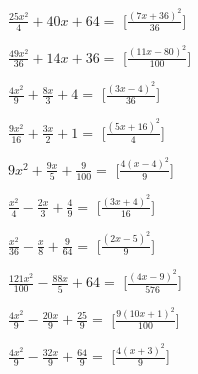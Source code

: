 \begin{esercizio}
\begin{multicols}{2}
\begin{enumeratea}
\item \(\frac{25 x^{2}}{4} + 40 x + 64=\) 
\hfill [\(\frac{\left(7 x + 36\right)^{2}}{36}\)]
\item \(\frac{49 x^{2}}{36} + 14 x + 36=\) 
\hfill [\(\frac{\left(11 x - 80\right)^{2}}{100}\)]
\item \(\frac{4 x^{2}}{9} + \frac{8 x}{3} + 4=\) 
\hfill [\(\frac{\left(3 x - 4\right)^{2}}{36}\)]
\item \(\frac{9 x^{2}}{16} + \frac{3 x}{2} + 1=\) 
[\(\frac{\left(5 x + 16\right)^{2}}{4}\)]
\item \(9 x^{2} + \frac{9 x}{5} + \frac{9}{100}=\) 
\hfill [\(\frac{4 \left(x - 4\right)^{2}}{9}\)]
\item \(\frac{x^{2}}{4} - \frac{2 x}{3} + \frac{4}{9}=\) 
\hfill [\(\frac{\left(3 x + 4\right)^{2}}{16}\)]
\item \(\frac{x^{2}}{36} - \frac{x}{8} + \frac{9}{64}=\) 
\hfill [\(\frac{\left(2 x - 5\right)^{2}}{9}\)]
\item \(\frac{121 x^{2}}{100} - \frac{88 x}{5} + 64=\) 
\hfill [\(\frac{\left(4 x - 9\right)^{2}}{576}\)]
\item \(\frac{4 x^{2}}{9} - \frac{20 x}{9} + \frac{25}{9}=\) 
\hfill [\(\frac{9 \left(10 x + 1\right)^{2}}{100}\)]
\item \(\frac{4 x^{2}}{9} - \frac{32 x}{9} + \frac{64}{9}=\) 
\hfill [\(\frac{4 \left(x + 3\right)^{2}}{9}\)]

\end{enumeratea}
\end{multicols}
\end{esercizio}
